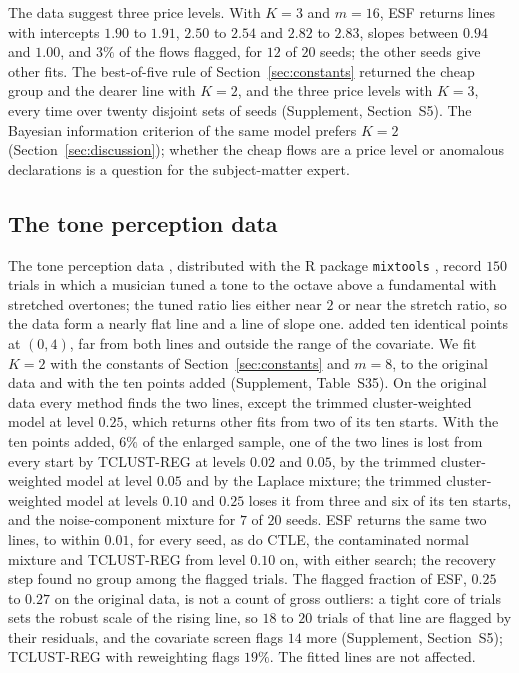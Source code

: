 The data suggest three price levels. With $K=3$ and $m=16$, ESF returns lines with intercepts
$1.90$ to $1.91$, $2.50$ to $2.54$ and $2.82$ to $2.83$, slopes between $0.94$ and $1.00$, and
$3\%$ of the flows flagged, for $12$ of $20$ seeds; the other seeds give other fits. The
best-of-five rule of Section~\ref{sec:constants} returned the cheap group and the dearer line
with $K=2$, and the three price levels with $K=3$, every time over twenty disjoint sets of
seeds (Supplement, Section~S5). The Bayesian information criterion of the same model
prefers $K=2$ (Section~\ref{sec:discussion}); whether the cheap flows are a price level or
anomalous declarations is a question for the subject-matter expert.


\subsection{The tone perception data}
\label{sec:tone}

The tone perception data \citep{deveaux1989mixtures}, distributed with the R package
\texttt{mixtools} \citep{benaglia2009mixtools}, record $150$ trials in which a musician tuned a
tone to the octave above a fundamental with stretched overtones; the tuned ratio lies either
near $2$ or near the stretch ratio, so the data form a nearly flat line and a line of slope
one. \citet{bai2012robust} added ten identical points at $(0,4)$, far
from both lines and outside the range of the covariate. We fit $K=2$ with the constants of
Section~\ref{sec:constants} and $m=8$, to the original data and with the ten points added
(Supplement, Table~S35). On the original data every method finds the two lines, except the
trimmed cluster-weighted model at level $0.25$, which returns other fits from two of its ten
starts. With the ten points added, $6\%$ of the enlarged sample, one of the two lines is lost
from every start by TCLUST-REG at levels $0.02$ and $0.05$, by the trimmed cluster-weighted
model at level $0.05$ and by the Laplace mixture; the trimmed cluster-weighted model at levels
$0.10$ and $0.25$ loses it from three and six of its ten starts, and the noise-component
mixture for $7$ of $20$ seeds. ESF returns the same two
lines, to within $0.01$, for every seed, as do CTLE, the contaminated normal mixture and
TCLUST-REG from level $0.10$ on, with either search; the recovery step found no group among the
flagged trials. The flagged fraction of ESF, $0.25$ to $0.27$ on the original data, is not a
count of gross outliers: a tight core of trials sets the robust scale of the rising line, so
$18$ to $20$ trials of that line are flagged by their residuals, and the covariate screen flags
$14$ more (Supplement, Section~S5); TCLUST-REG with reweighting flags $19\%$. The fitted
lines are not affected.

